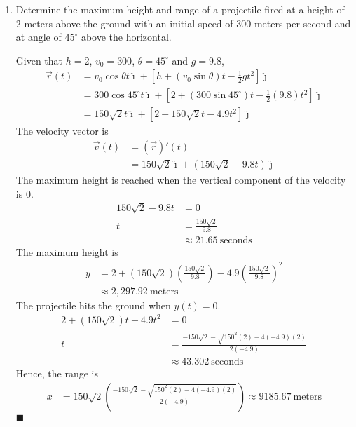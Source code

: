 \begin{enumerate}
    \item Determine the maximum height and range of a projectile fired at a height of 2
          meters above the ground with an initial speed of 300 meters per second and at
          angle of $45^{\circ}$ above the horizontal.

          \sol{}  Given that $h = 2$, $v_0 = 300$, $\theta = 45^{\circ}$ and $g = 9.8$,
          \begin{align*}
              \vec{r}(t) & = v_0\cos\theta t\hat{\imath} + \left[h + (v_0\sin\theta) t - \frac{1}{2}gt^2\right]\hat{\jmath}                 \\
                         & = 300\cos{45^{\circ}} t\hat{\imath} + \left[2 + (300\sin{45^{\circ}}) t - \frac{1}{2}(9.8)t^2\right]\hat{\jmath} \\
                         & = 150\sqrt{2} t\hat{\imath} + \left[2 + 150\sqrt{2} t - 4.9t^2\right]\hat{\jmath}
          \end{align*}
          The velocity vector is
          \begin{align*}
              \vec{v}(t) & = (\vec{r})'(t)                                              \\
                         & = 150\sqrt{2}\hat{\imath} + (150\sqrt{2} - 9.8t)\hat{\jmath}
          \end{align*}
          The maximum height is reached when the vertical component of the velocity is $0$.
          \begin{align*}
              150\sqrt{2} - 9.8t & = 0                           \\
              t                  & = \frac{150\sqrt{2}}{9.8}     \\
                                 & \approx 21.65\ \text{seconds}
          \end{align*}
          The maximum height is
          \begin{align*}
              y & = 2 + (150\sqrt{2})\left(\frac{150\sqrt{2}}{9.8}\right) - 4.9\left(\frac{150\sqrt{2}}{9.8}\right)^2 \\
                & \approx 2,297.92\ \text{meters}
          \end{align*}
          The projectile hits the ground when $y(t) = 0$.
          \begin{align*}
              2 + (150\sqrt{2}) t - 4.9t^2 & = 0                                                           \\
              t                            & = \frac{-150\sqrt{2} - \sqrt{150^2(2) - 4(-4.9)(2)}}{2(-4.9)} \\
                                           & \approx 43.302\ \text{seconds}
          \end{align*}
          Hence, the range is
          \begin{align*}
              x & = 150\sqrt{2} \left(\frac{-150\sqrt{2} - \sqrt{150^2(2) - 4(-4.9)(2)}}{2(-4.9)}\right) \approx 9185.67\ \text{meters}
          \end{align*} \hfill$\blacksquare$


\end{enumerate}
